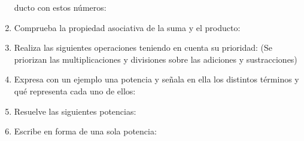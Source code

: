 \documentclass[twoside]{article}
\begin{document}
\begin{enumerate}
ducto con estos números:
\begin{enumerate}
\end{enumerate}
\item Comprueba la propiedad asociativa de la suma y el producto:
\begin{enumerate}
\end{enumerate}
\item Realiza las siguientes operaciones teniendo en cuenta su prioridad: (Se priorizan las multiplicaciones y divisiones sobre las adiciones y sustracciones)
\begin{enumerate}
\end{enumerate}
\item Expresa con un ejemplo una potencia y señala en ella los distintos términos y qué representa cada uno de ellos:
\item Resuelve las siguientes potencias:
\begin{enumerate}
\end{enumerate}
\item Escribe en forma de una sola potencia:
\begin{enumerate}
\end{enumerate}
\end{enumerate}
\end{document}
